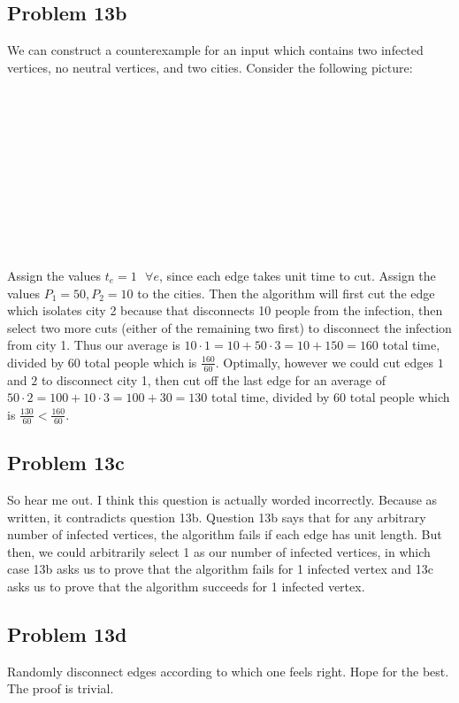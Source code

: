 \documentclass[12pt]{article}
\begin{document}
	\subsection*{Problem 13b}
We can construct a counterexample for an input which contains two infected vertices, no neutral vertices, and two cities. Consider the following picture:\\
\\
\\				
\\
\\
\\
\\
\\
\\
\\
\\
\\
Assign the values $t_e = 1 \text{ }\forall e$, since each edge takes unit time to cut. Assign the values $P_1 = 50, P_2 = 10$ to the cities. Then the algorithm will first cut the edge which isolates city 2 because that disconnects 10 people from the infection, then select two more cuts (either of the remaining two first) to disconnect the infection from city 1. Thus our average is $10 \cdot 1 = 10 + 50 \cdot 3 = 10 + 150 = 160$ total time, divided by $60$ total people which is $\frac{160}{60}$. Optimally, however we could cut edges $1$ and $2$ to disconnect city 1, then cut off the last edge for an average of $50 \cdot 2 = 100 + 10 \cdot 3 = 100 + 30 = 130$ total time, divided by $60$ total people which is $\frac{130}{60} < \frac{160}{60}$.

	\subsection*{Problem 13c}
So hear me out. I think this question is actually worded incorrectly. Because as written, it contradicts question 13b. Question 13b says that for any arbitrary number of infected vertices, the algorithm fails if each edge has unit length. But then, we could arbitrarily select 1 as our number of infected vertices, in which case 13b asks us to prove that the algorithm fails for 1 infected vertex and 13c asks us to prove that the algorithm succeeds for 1 infected vertex.

	\subsection*{Problem 13d}
Randomly disconnect edges according to which one feels right. Hope for the best.\\
The proof is trivial.
\end{document}
